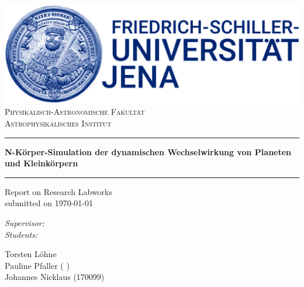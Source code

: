 \documentclass[a4paper,headsepline,12pt,oneside]{scrartcl}
\begin{document}
\begin{titlepage}

\thispagestyle{empty}
    \makeatletter
    \centering
    \includegraphics[scale = 0.2]{graphics/fsulogo.jpg}\\[1.0 cm]
    \textsc{\Large Physikalisch-Astronomische Fakultät\\Astrophysikalisches Institut}
    \vspace{1cm} \hrule \vspace{0.4cm}
    \Large \textbf{N-Körper-Simulation der dynamischen Wechselwirkung von Planeten und Kleinkörpern}
    \vspace{0.4cm} \hrule \vspace{1cm}
    \Large Report on Research Labworks \\
    submitted on \today \\
    \vspace{1cm}

    \begin{minipage}[t]{0.4\textwidth}
        \begin{flushright} \large
            \emph{Supervisor:}\\
            \emph{Students:}
         \end{flushright}
    \end{minipage}
    \hspace{0.5cm}
    \begin{minipage}[t]{0.4\textwidth}
    \begin{flushleft} \large
          Torsten Löhne \\
          Pauline Pfaller ( ) \\ Johannes Nicklaus (170099) 
    \end{flushleft}
    \end{minipage}\\[2 cm]
    \makeatother
\end{titlepage}
\end{document}
